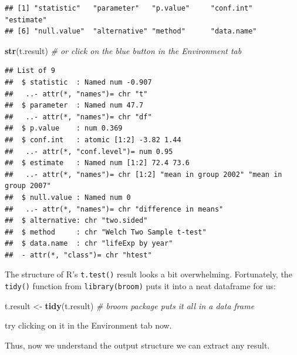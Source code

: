 \documentclass[]{book}
\makeatletter
\newenvironment{Shaded}{\begin{snugshade}}{\end{snugshade}}
\newcommand{\CommentTok}[1]{\textcolor[rgb]{0.56,0.35,0.01}{\textit{#1}}}
\newcommand{\KeywordTok}[1]{\textcolor[rgb]{0.13,0.29,0.53}{\textbf{#1}}}
\newcommand{\NormalTok}[1]{#1}
\newcommand{\OperatorTok}[1]{\textcolor[rgb]{0.81,0.36,0.00}{\textbf{#1}}}
\newcommand{\StringTok}[1]{\textcolor[rgb]{0.31,0.60,0.02}{#1}}
\newenvironment{kframe}{%
\medskip{}
\setlength{\fboxsep}{.8em}
 \def\at@end@of@kframe{}%
 \ifinner\ifhmode%
  \def\at@end@of@kframe{\end{minipage}}%
  \begin{minipage}{\columnwidth}%
 \fi\fi%
 \def\FrameCommand##1{\hskip\@totalleftmargin \hskip-\fboxsep
 \colorbox{shadecolor}{##1}\hskip-\fboxsep
     \hskip-\linewidth \hskip-\@totalleftmargin \hskip\columnwidth}%
 \MakeFramed {\advance\hsize-\width
   \@totalleftmargin\z@ \linewidth\hsize
   \@setminipage}}%
 {\par\unskip\endMakeFramed%
 \at@end@of@kframe}
\renewenvironment{Shaded}{\begin{kframe}}{\end{kframe}}
\theoremstyle{definition}
\theoremstyle{definition}
\theoremstyle{definition}
\theoremstyle{remark}
\makeatother
\begin{document}
\begin{verbatim}
## [1] "statistic"   "parameter"   "p.value"     "conf.int"    "estimate"   
## [6] "null.value"  "alternative" "method"      "data.name"
\end{verbatim}

\begin{Shaded}
\begin{Highlighting}[]
\KeywordTok{str}\NormalTok{(t.result) }\CommentTok{# or click on the blue button in the Environment tab}
\end{Highlighting}
\end{Shaded}

\begin{verbatim}
## List of 9
##  $ statistic  : Named num -0.907
##   ..- attr(*, "names")= chr "t"
##  $ parameter  : Named num 47.7
##   ..- attr(*, "names")= chr "df"
##  $ p.value    : num 0.369
##  $ conf.int   : atomic [1:2] -3.82 1.44
##   ..- attr(*, "conf.level")= num 0.95
##  $ estimate   : Named num [1:2] 72.4 73.6
##   ..- attr(*, "names")= chr [1:2] "mean in group 2002" "mean in group 2007"
##  $ null.value : Named num 0
##   ..- attr(*, "names")= chr "difference in means"
##  $ alternative: chr "two.sided"
##  $ method     : chr "Welch Two Sample t-test"
##  $ data.name  : chr "lifeExp by year"
##  - attr(*, "class")= chr "htest"
\end{verbatim}

The structure of R's \texttt{t.test()} result looks a bit overwhelming.
Fortunately, the \texttt{tidy()} function from \texttt{library(broom)}
puts it into a neat dataframe for us:

\begin{Shaded}
\begin{Highlighting}[]
\NormalTok{t.result <-}\StringTok{ }\KeywordTok{tidy}\NormalTok{(t.result) }\CommentTok{# broom package puts it all in a data frame}
\end{Highlighting}
\end{Shaded}

try clicking on it in the Environment tab now.

Thus, now we understand the output structure we can extract any result.

\begin{Shaded}
\end{Shaded}
\end{document}
